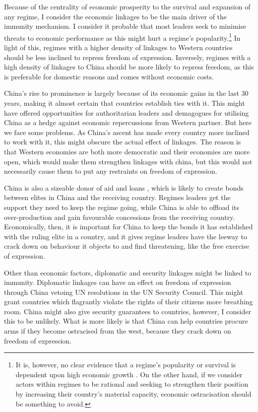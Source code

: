 Because of the centrality of economic prosperity to the survival and expansion of any regime, I consider the economic linkages to be the main driver of the immunity mechanism. I consider it probable that most leaders seek to minimise threats to economic performance as this might hurt a regime's popularity.\footnote{It is, however, no clear evidence that a regime's popularity or survival is dependent upon high economic growth \citep{chu_sources_2013, stockemer_economic_2020}. On the other hand, if we consider actors within regimes to be rational and seeking to strengthen their position by increasing their country's material capacity, economic ostracisation should be something to avoid.} In light of this, regimes with a higher density of linkages to Western countries should be less inclined to repress freedom of expression. Inversely, regimes with a high density of linkages to China should be more likely to repress freedom, as this is preferable for domestic reasons and comes without economic costs. 

China's rise to prominence is largely because of its economic gains in the last 30 years, making it almost certain that countries establish ties with it. This might have offered opportunities for authoritarian leaders and demagogues for utilising China as a hedge against economic repercussions from Western partner. But here we face some problems. As China's ascent has made every country more inclined to work with it, this might obscure the actual effect of linkages. The reason is that Western economies are both more democratic and their economies are more open, which would make them strengthen linkages with china, but this would not necessarily cause them to put any restraints on freedom of expression. 

China is also a sizeable donor of aid and loans \citep{fuchs_why_2022}, which is likely to create bonds between elites in China and the receiving country. Regimes leaders get the support they need to keep the regime going, while China is able to offload its over-production and gain favourable concessions from the receiving country. Economically, then, it is important for China to keep the bonds it has established with the ruling elite in a country, and it gives regime leaders have the leeway to crack down on behaviour it objects to and find threatening, like the free exercise of expression.

Other than economic factors, diplomatic and security linkages might be linked to immunity. Diplomatic linkages can have an effect on freedom of expression through China vetoing UN resolutions in the UN Security Council. This might grant countries which flagrantly violate the rights of their citizens more breathing room. China might also give security guarantees to countries, however, I consider this to be unlikely. What is more likely is that China can help countries procure arms if they become ostracised from the west, because they crack down on freedom of expression.

